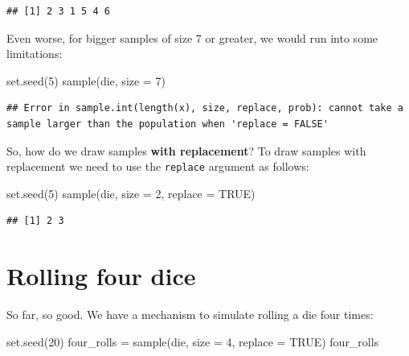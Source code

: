 \documentclass[
]{book}
\newenvironment{Shaded}{\begin{snugshade}}{\end{snugshade}}
\newcommand{\AttributeTok}[1]{\textcolor[rgb]{0.77,0.63,0.00}{#1}}
\newcommand{\ConstantTok}[1]{\textcolor[rgb]{0.00,0.00,0.00}{#1}}
\newcommand{\DecValTok}[1]{\textcolor[rgb]{0.00,0.00,0.81}{#1}}
\newcommand{\FunctionTok}[1]{\textcolor[rgb]{0.00,0.00,0.00}{#1}}
\newcommand{\NormalTok}[1]{#1}
\newcommand{\OtherTok}[1]{\textcolor[rgb]{0.56,0.35,0.01}{#1}}
\begin{document}
\begin{verbatim}
## [1] 2 3 1 5 4 6
\end{verbatim}

Even worse, for bigger samples of size 7 or greater, we would run into some
limitations:

\begin{Shaded}
\begin{Highlighting}[]
\FunctionTok{set.seed}\NormalTok{(}\DecValTok{5}\NormalTok{)}
\FunctionTok{sample}\NormalTok{(die, }\AttributeTok{size =} \DecValTok{7}\NormalTok{)}
\end{Highlighting}
\end{Shaded}

\begin{verbatim}
## Error in sample.int(length(x), size, replace, prob): cannot take a sample larger than the population when 'replace = FALSE'
\end{verbatim}

So, how do we draw samples \textbf{with replacement}? To draw samples with
replacement we need to use the \texttt{replace} argument as follows:

\begin{Shaded}
\begin{Highlighting}[]
\FunctionTok{set.seed}\NormalTok{(}\DecValTok{5}\NormalTok{)}
\FunctionTok{sample}\NormalTok{(die, }\AttributeTok{size =} \DecValTok{2}\NormalTok{, }\AttributeTok{replace =} \ConstantTok{TRUE}\NormalTok{)}
\end{Highlighting}
\end{Shaded}

\begin{verbatim}
## [1] 2 3
\end{verbatim}

\hypertarget{rolling-four-dice}{%
\section{Rolling four dice}\label{rolling-four-dice}}

So far, so good. We have a mechanism to simulate rolling a die four times:

\begin{Shaded}
\begin{Highlighting}[]
\FunctionTok{set.seed}\NormalTok{(}\DecValTok{20}\NormalTok{)}
\NormalTok{four\_rolls }\OtherTok{=} \FunctionTok{sample}\NormalTok{(die, }\AttributeTok{size =} \DecValTok{4}\NormalTok{, }\AttributeTok{replace =} \ConstantTok{TRUE}\NormalTok{)}
\NormalTok{four\_rolls}
\end{Highlighting}
\end{Shaded}
\end{document}
